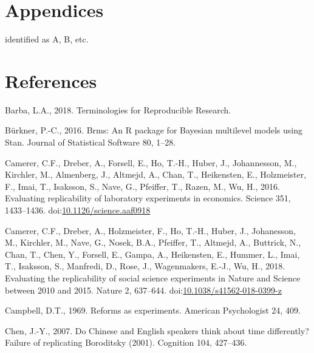 \documentclass[]{elsarticle} %
\newlength{\cslhangindent}
\newenvironment{CSLReferences}[2] %
 {%
  \setlength{\parindent}{0pt}
  \ifodd #1 \everypar{\setlength{\hangindent}{\cslhangindent}}\ignorespaces\fi
  \ifnum #2 > 0
  \setlength{\parskip}{#2\baselineskip}
  \fi
 }%
 {}
\begin{document}
\hypertarget{appendices}{%
\section{Appendices}\label{appendices}}

identified as A, B, etc.

\hypertarget{references}{%
\section*{References}\label{references}}

\hypertarget{refs}{}
\begin{CSLReferences}{1}{0}
\leavevmode{}%
Barba, L.A., 2018. Terminologies for {Reproducible} {Research}.

\leavevmode{}%
Bürkner, P.-C., 2016. Brms: {An} {R} package for {Bayesian} multilevel
models using {Stan}. Journal of Statistical Software 80, 1--28.

\leavevmode{}%
Camerer, C.F., Dreber, A., Forsell, E., Ho, T.-H., Huber, J.,
Johannesson, M., Kirchler, M., Almenberg, J., Altmejd, A., Chan, T.,
Heikensten, E., Holzmeister, F., Imai, T., Isaksson, S., Nave, G.,
Pfeiffer, T., Razen, M., Wu, H., 2016. Evaluating replicability of
laboratory experiments in economics. Science 351, 1433--1436.
doi:\href{https://doi.org/10.1126/science.aaf0918}{10.1126/science.aaf0918}

\leavevmode{}%
Camerer, C.F., Dreber, A., Holzmeister, F., Ho, T.-H., Huber, J.,
Johanesson, M., Kirchler, M., Nave, G., Nosek, B.A., Pfeiffer, T.,
Altmejd, A., Buttrick, N., Chan, T., Chen, Y., Forsell, E., Gampa, A.,
Heikensten, E., Hummer, L., Imai, T., Isaksson, S., Manfredi, D., Rose,
J., Wagenmakers, E.-J., Wu, H., 2018. Evaluating the replicability of
social science experiments in {Nature} and {Science} between 2010 and
2015. Nature 2, 637--644.
doi:\href{https://doi.org/10.1038/s41562-018-0399-z}{10.1038/s41562-018-0399-z}

\leavevmode{}%
Campbell, D.T., 1969. Reforms as experiments. American Psychologist 24,
409.

\leavevmode{}%
Chen, J.-Y., 2007. Do {Chinese} and {English} speakers think about time
differently? {Failure} of replicating {Boroditsky} (2001). Cognition
104, 427--436.


\end{CSLReferences}
\end{document}
